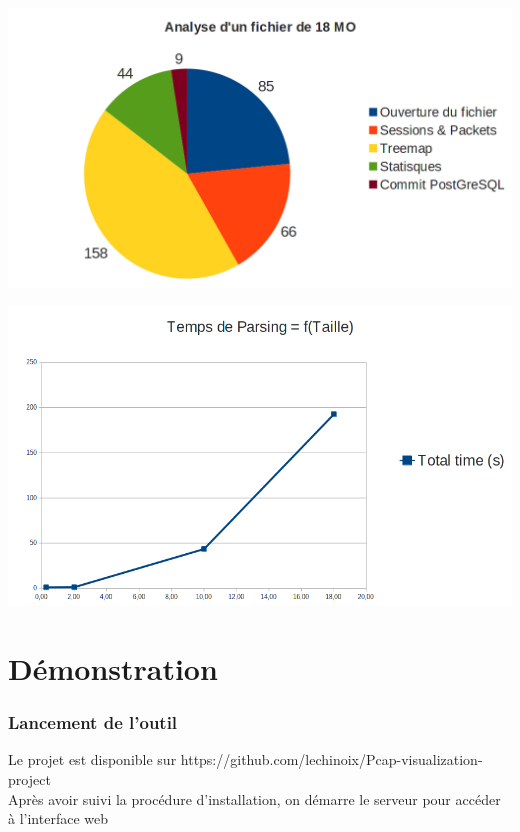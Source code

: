 \documentclass{beamer}
\begin{document}
  \begin{frame}
    \begin{center}
      \includegraphics[scale=0.3]{parse-time.png}
    \end{center} 
  \end{frame}
  
  \begin{frame}
    \begin{center}
       \includegraphics[scale=0.3]{parse-temps.png}
    \end{center} 
  \end{frame}

  
 \section{Démonstration}
  \begin{frame}
    \frametitle{Lancement de l'outil}
    Le projet est disponible sur https://github.com/lechinoix/Pcap-visualization-project \\
    Après avoir suivi la procédure d'installation, on démarre le serveur pour accéder à l'interface web \\
  \end{frame}
\end{document}
